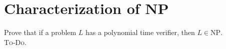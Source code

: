 

\setcounter{section}{1}


\section{Characterization of \textsc{NP}}

Prove that if a problem $L$ has a polynomial time verifier, then $L \in \text{NP}$.\\

\textsc{To-Do.}


